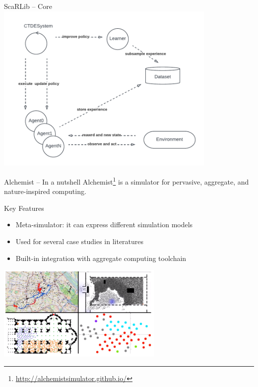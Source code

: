 \documentclass[presentation, 9pt]{beamer}\mode<presentation>{\usetheme{AMSBolognaFC}}
\begin{document}
\begin{frame}{ScaRLib -- Core}
\centering
\includegraphics[width=0.8\textwidth]{img/ctdesystem.pdf}
\end{frame}
\begin{frame}{Alchemist -- In a nutshell}
Alchemist\footnote{\url{http://alchemistsimulator.github.io/}} is a simulator for pervasive, aggregate, and nature-inspired computing.

\begin{exampleblock}{Key Features}
\begin{itemize}
	\item Meta-simulator: it can express different simulation models 
	\item Used for several case studies in literatures
	\item Built-in integration with aggregate computing toolchain
\end{itemize}
\end{exampleblock}
\centering
\includegraphics[width=0.6\textwidth]{img/alchemist}

\end{frame}
\end{document}
